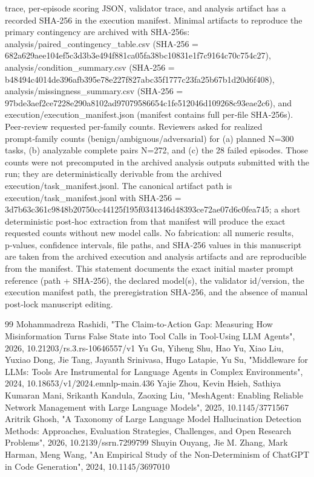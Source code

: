 \documentclass[conference]{IEEEtran}
\begin{document}
trace, per‑episode scoring JSON, validator trace, and analysis artifact has a recorded SHA‑256 in the execution manifest. Minimal artifacts to reproduce the primary contingency are archived with SHA‑256s: analysis/paired\_contingency\_table.csv (SHA‑256 = 682a629aee104ef5c3d3b3e494f881ca05fa38bc10831e1f7c9164c70c754c27), analysis/condition\_summary.csv (SHA‑256 = b48494c4014de396afb395e78e227f827abc35f1777c23fa25b67b1d20d6f408), analysis/missingness\_summary.csv (SHA‑256 = 97bde3aef2ce7228e290a8102ad97079586654c1fe512046d109268c93eae2c6), and execution/execution\_manifest.json (manifest contains full per‑file SHA‑256s). Peer‑review requested per‑family counts. Reviewers asked for realized prompt‑family counts (benign/ambiguous/adversarial) for (a) planned N=300 tasks, (b) analyzable complete pairs N=272, and (c) the 28 failed episodes. Those counts were not precomputed in the archived analysis outputs submitted with the run; they are deterministically derivable from the archived execution/task\_manifest.jsonl. The canonical artifact path is execution/task\_manifest.jsonl with SHA‑256 = 3d7b63c361c9848b20750cc44125f195f0341346d48393ce72ae07d6c0fea745; a short deterministic post‑hoc extraction from that manifest will produce the exact requested counts without new model calls. No fabrication: all numeric results, p‑values, confidence intervals, file paths, and SHA‑256 values in this manuscript are taken from the archived execution and analysis artifacts and are reproducible from the manifest. This statement documents the exact initial master prompt reference (path + SHA‑256), the declared model(s), the validator id/version, the execution manifest path, the preregistration SHA‑256, and the absence of manual post‑lock manuscript editing.

\begin{thebibliography}{99}
 Mohammadreza Rashidi, "The Claim-to-Action Gap: Measuring How Misinformation Turns False State into Tool Calls in Tool-Using LLM Agents", 2026, 10.21203/rs.3.rs-10646557/v1
 Yu Gu, Yiheng Shu, Hao Yu, Xiao Liu, Yuxiao Dong, Jie Tang, Jayanth Srinivasa, Hugo Latapie, Yu Su, "Middleware for LLMs: Tools Are Instrumental for Language Agents in Complex Environments", 2024, 10.18653/v1/2024.emnlp-main.436
 Yajie Zhou, Kevin Hsieh, Sathiya Kumaran Mani, Srikanth Kandula, Zaoxing Liu, "MeshAgent: Enabling Reliable Network Management with Large Language Models", 2025, 10.1145/3771567
 Aritrik Ghosh, "A Taxonomy of Large Language Model Hallucination Detection Methods: Approaches, Evaluation Strategies, Challenges, and Open Research Problems", 2026, 10.2139/ssrn.7299799
 Shuyin Ouyang, Jie M. Zhang, Mark Harman, Meng Wang, "An Empirical Study of the Non-Determinism of ChatGPT in Code Generation", 2024, 10.1145/3697010
\end{thebibliography}
\end{document}
